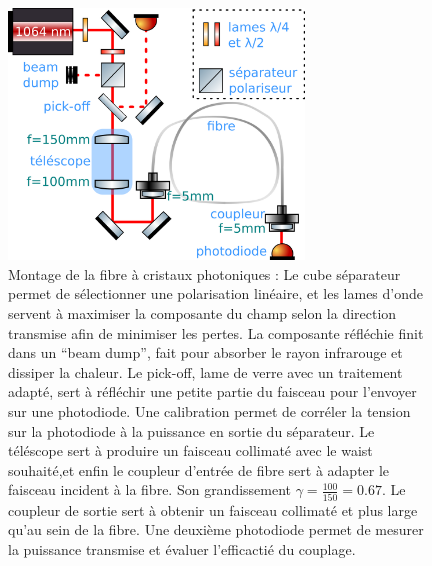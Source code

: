 \documentclass[11pt,a4paper] { article}
\begin{document}
\begin{figure}[h]
	\centering
	\includegraphics[width=0.7\textwidth]{./img/schema couplage.png}
	\caption[Montage de la fibre à cristaux photoniques]{Montage de la fibre à cristaux photoniques :
	\small Le cube séparateur permet de sélectionner une polarisation linéaire, et les lames d'onde servent à maximiser la composante du champ selon la direction transmise afin de minimiser les pertes. La composante réfléchie finit dans un ``beam dump'', fait pour absorber le rayon infrarouge et dissiper la chaleur. Le pick-off, lame de verre avec un traitement adapté, sert à réfléchir une petite partie du faisceau pour l'envoyer sur une photodiode. Une calibration permet de corréler la tension sur la photodiode à la puissance en sortie du séparateur. Le téléscope sert à produire un faisceau collimaté avec le waist souhaité,et enfin le coupleur d'entrée de fibre sert à adapter le faisceau incident à la fibre. Son grandissement $\gamma = \frac{100}{150} = 0.67$. Le coupleur de sortie sert à obtenir un faisceau collimaté et plus large qu'au sein de la fibre. Une deuxième photodiode permet de mesurer la puissance transmise et évaluer l'efficactié du couplage.}
	\label{fig:couplage}
\end{figure}
\end{document}
